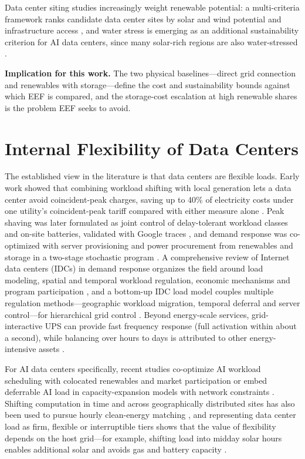 Data center siting studies increasingly weight renewable potential: a multi-criteria framework ranks candidate data center sites by solar and wind potential and infrastructure access \cite{r34}, and water stress is emerging as an additional sustainability criterion for AI data centers, since many solar-rich regions are also water-stressed \cite{r35}.

\textbf{Implication for this work.} The two physical baselines---direct grid connection and renewables with storage---define the cost and sustainability bounds against which EEF is compared, and the storage-cost escalation at high renewable shares is the problem EEF seeks to avoid.

\section{Internal Flexibility of Data Centers}\label{sec:2-6}

The established view in the literature is that data centers are flexible loads. Early work showed that combining workload shifting with local generation lets a data center avoid coincident-peak charges, saving up to 40\% of electricity costs under one utility's coincident-peak tariff compared with either measure alone \cite{r2}. Peak shaving was later formulated as joint control of delay-tolerant workload classes and on-site batteries, validated with Google traces \cite{r6}, and demand response was co-optimized with server provisioning and power procurement from renewables and storage in a two-stage stochastic program \cite{r5}. A comprehensive review of Internet data centers (IDCs) in demand response organizes the field around load modeling, spatial and temporal workload regulation, economic mechanisms and program participation \cite{r3}, and a bottom-up IDC load model couples multiple regulation methods---geographic workload migration, temporal deferral and server control---for hierarchical grid control \cite{r4}. Beyond energy-scale services, grid-interactive UPS can provide fast frequency response (full activation within about a second), while balancing over hours to days is attributed to other energy-intensive assets \cite{r7}.

For AI data centers specifically, recent studies co-optimize AI workload scheduling with colocated renewables and market participation \cite{r8} or embed deferrable AI load in capacity-expansion models with network constraints \cite{r24}. Shifting computation in time and across geographically distributed sites has also been used to pursue hourly clean-energy matching \cite{r9}, and representing data center load as firm, flexible or interruptible tiers shows that the value of flexibility depends on the host grid---for example, shifting load into midday solar hours enables additional solar and avoids gas and battery capacity \cite{r27}.

